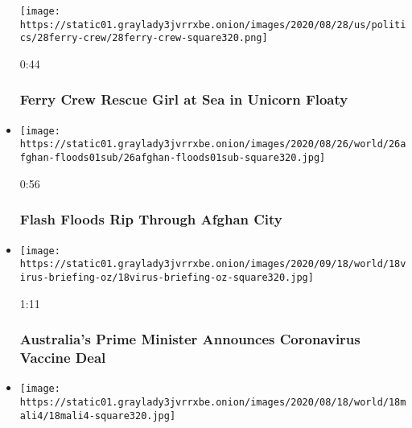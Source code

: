 \begin{itemize}
  \texttt{[image: https://static01.graylady3jvrrxbe.onion/images/2020/08/28/us/politics/28ferry-crew/28ferry-crew-square320.png]}

  0:44

  \hypertarget{ferry-crew-rescue-girl-at-sea-in-unicorn-floaty}{%
  \subsubsection{Ferry Crew Rescue Girl at Sea in Unicorn
  Floaty}\label{ferry-crew-rescue-girl-at-sea-in-unicorn-floaty}}
\item
  \href{https://www.nytimes3xbfgragh.onion/video/us/100000007308896/afghan-floods-video.html?action=click\&module=video-series-bar\&region=header\&pgtype=Article\&playlistId=video/world}{}

  \texttt{[image: https://static01.graylady3jvrrxbe.onion/images/2020/08/26/world/26afghan-floods01sub/26afghan-floods01sub-square320.jpg]}

  0:56

  \hypertarget{flash-floods-rip-through-afghan-city}{%
  \subsubsection{Flash Floods Rip Through Afghan
  City}\label{flash-floods-rip-through-afghan-city}}
\item
  \href{https://www.nytimes3xbfgragh.onion/video/us/politics/100000007296394/australia-coronavirus-vaccine.html?action=click\&module=video-series-bar\&region=header\&pgtype=Article\&playlistId=video/world}{}

  \texttt{[image: https://static01.graylady3jvrrxbe.onion/images/2020/09/18/world/18virus-briefing-oz/18virus-briefing-oz-square320.jpg]}

  1:11

  \hypertarget{australias-prime-minister-announces-coronavirus-vaccine-deal}{%
  \subsubsection{Australia's Prime Minister Announces Coronavirus
  Vaccine
  Deal}\label{australias-prime-minister-announces-coronavirus-vaccine-deal}}
\item
  \href{https://www.nytimes3xbfgragh.onion/video/world/africa/100000007295438/mali-coup-keita.html?action=click\&module=video-series-bar\&region=header\&pgtype=Article\&playlistId=video/world}{}

  \texttt{[image: https://static01.graylady3jvrrxbe.onion/images/2020/08/18/world/18mali4/18mali4-square320.jpg]}


\end{itemize}
